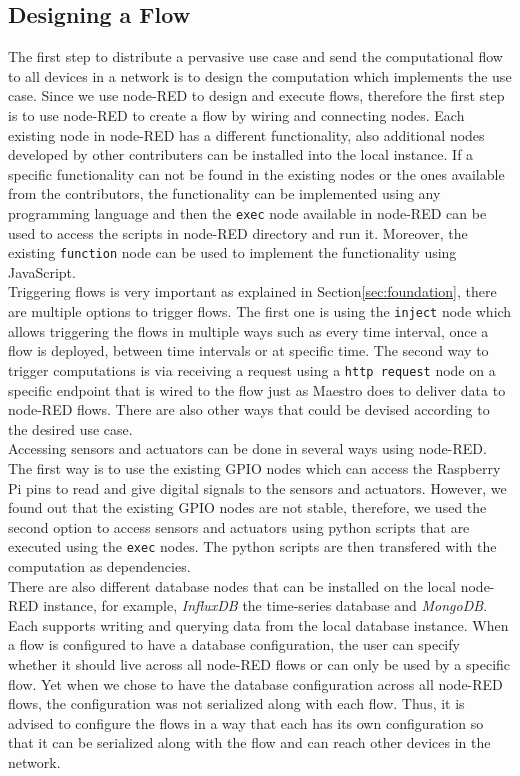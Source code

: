\subsection{Designing a Flow}
The first step to distribute a pervasive use case and send the computational flow to all devices in a network is to design the computation which implements the use case. Since we use node-RED to design and execute flows, therefore the first step is to use node-RED to create a flow by wiring and connecting nodes. Each existing node in node-RED has a different functionality, also additional nodes developed by other contributers can be installed into the local instance. If a specific functionality can not be found  in the existing nodes or the ones available from the contributors, the functionality can be implemented using any programming language and then  the \verb|exec| node available in node-RED can be used to access the scripts in node-RED directory and run it. Moreover, the  existing \verb|function| node can be used to implement the functionality using  JavaScript. \\

\noindent Triggering flows is very important as explained in Section\ref{sec:foundation}, there are multiple options to trigger flows. The first one is using the \verb|inject| node which allows  triggering the flows in multiple ways such as every time interval, once a flow is deployed, between time intervals or at specific time. The second way to trigger computations is via receiving a request using a \verb|http request| node on a specific endpoint that is wired to the flow just as Maestro does to deliver data to node-RED flows. There are also other ways that could be devised according to the desired use case.\\
 

\noindent Accessing sensors and actuators can be done in several ways using node-RED. The first way is to use the existing GPIO nodes which can access the Raspberry Pi pins to read  and give digital signals to the sensors and actuators. However, we found out that the existing GPIO nodes are not stable, therefore, we used the second option to access sensors and actuators using python scripts that are executed using the \verb|exec| nodes. The python scripts are then transfered with the computation as  dependencies.\\

\noindent There are also different  database nodes that can be installed on the local node-RED instance, for example, \textit{InfluxDB} the time-series database and \textit{MongoDB}. Each supports writing and querying data from the local database instance. When a flow is configured to have a database configuration, the user can specify whether it should live across all node-RED flows or can  only be used by a specific flow.  Yet when we chose to have the database configuration across all node-RED flows, the configuration was not serialized along with each flow. Thus, it is advised to configure the flows in a way that each has its own configuration so that it can be serialized along with the flow and can reach other devices in the network.\\



